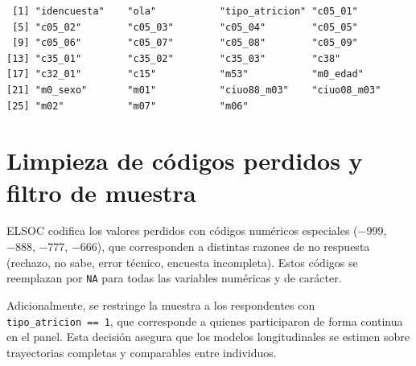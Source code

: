 \documentclass[
  spanish,
  a4paper,
  oneside]{scrbook}
\begin{document}
\begin{verbatim}
 [1] "idencuesta"    "ola"           "tipo_atricion" "c05_01"       
 [5] "c05_02"        "c05_03"        "c05_04"        "c05_05"       
 [9] "c05_06"        "c05_07"        "c05_08"        "c05_09"       
[13] "c35_01"        "c35_02"        "c35_03"        "c38"          
[17] "c32_01"        "c15"           "m53"           "m0_edad"      
[21] "m0_sexo"       "m01"           "ciuo88_m03"    "ciuo08_m03"   
[25] "m02"           "m07"           "m06"          
\end{verbatim}

\section{Limpieza de códigos perdidos y filtro de
muestra}\label{limpieza-de-cuxf3digos-perdidos-y-filtro-de-muestra}

ELSOC codifica los valores perdidos con códigos numéricos especiales
(−999, −888, −777, −666), que corresponden a distintas razones de no
respuesta (rechazo, no sabe, error técnico, encuesta incompleta). Estos
códigos se reemplazan por \texttt{NA} para todas las variables numéricas
y de carácter.

Adicionalmente, se restringe la muestra a los respondentes con
\texttt{tipo\_atricion\ ==\ 1}, que corresponde a quienes participaron
de forma continua en el panel. Esta decisión asegura que los modelos
longitudinales se estimen sobre trayectorias completas y comparables
entre individuos.
\end{document}
